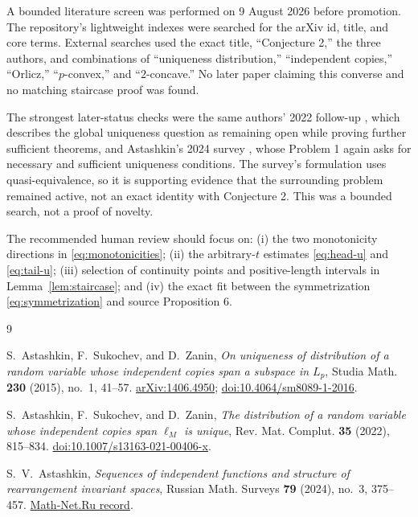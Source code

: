 \documentclass[11pt]{article}
\theoremstyle{definition}
\theoremstyle{remark}
\begin{document}
A bounded literature screen was performed on 9 August 2026 before promotion.
The repository's lightweight indexes were searched for the arXiv id, title,
and core terms.  External searches used the exact title, ``Conjecture 2,'' the
three authors, and combinations of ``uniqueness distribution,'' ``independent
copies,'' ``Orlicz,'' ``$p$-convex,'' and ``$2$-concave.''  No later paper
claiming this converse and no matching staircase proof was found.

The strongest later-status checks were the same authors' 2022 follow-up
\cite{ASZ22}, which describes the global uniqueness question as remaining open
while proving further sufficient theorems, and Astashkin's 2024 survey
\cite{Ast24}, whose Problem 1 again asks for necessary and sufficient uniqueness
conditions.  The survey's formulation uses quasi-equivalence, so it is
supporting evidence that the surrounding problem remained active, not an exact
identity with Conjecture 2.  This was a bounded search, not a proof of novelty.

The recommended human review should focus on: (i) the two monotonicity
directions in \eqref{eq:monotonicities}; (ii) the arbitrary-$t$ estimates
\eqref{eq:head-u} and \eqref{eq:tail-u}; (iii) selection of continuity points
and positive-length intervals in Lemma~\ref{lem:staircase}; and (iv) the exact
fit between the symmetrization \eqref{eq:symmetrization} and source
Proposition 6.

\begin{thebibliography}{9}

S.~Astashkin, F.~Sukochev, and D.~Zanin,
\emph{On uniqueness of distribution of a random variable whose independent
copies span a subspace in $L_p$},
Studia Math. \textbf{230} (2015), no.~1, 41--57.
\href{https://arxiv.org/abs/1406.4950}{arXiv:1406.4950};
\href{https://doi.org/10.4064/sm8089-1-2016}{doi:10.4064/sm8089-1-2016}.

S.~Astashkin, F.~Sukochev, and D.~Zanin,
\emph{The distribution of a random variable whose independent copies span
$\ell_M$ is unique},
Rev. Mat. Complut. \textbf{35} (2022), 815--834.
\href{https://doi.org/10.1007/s13163-021-00406-x}%
{doi:10.1007/s13163-021-00406-x}.

S.~V.~Astashkin,
\emph{Sequences of independent functions and structure of rearrangement
invariant spaces},
Russian Math. Surveys \textbf{79} (2024), no.~3, 375--457.
\href{https://www.mathnet.ru/eng/rm10171}{Math-Net.Ru record}.

\end{thebibliography}
\end{document}
